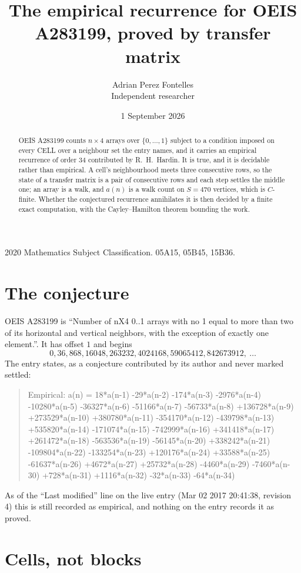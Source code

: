 \documentclass[11pt,a4paper]{article}
\title{The empirical recurrence for OEIS A283199, proved by transfer matrix}
\author{Adrian Perez Fontelles\\ \small Independent researcher}
\date{1 September 2026}
\theoremstyle{plain}
\theoremstyle{definition}
\begin{document}
\maketitle

\begin{abstract}
OEIS A283199 counts $n\times4$ arrays over $\{0,\dots,1\}$ subject to a condition imposed on
every CELL over a neighbour set the entry names, and it carries an empirical recurrence of
order $34$ contributed by R.~H.~Hardin. It is true, and it is decidable rather than
empirical. A cell's neighbourhood meets three consecutive rows, so the state of a transfer
matrix is a pair of consecutive rows and each step settles the middle one; an array is a
walk, and $a(n)$ is a walk count on $S=470$ vertices, which is $C$-finite. Whether the
conjectured recurrence annihilates it is then decided by a finite exact computation, with the
Cayley--Hamilton theorem bounding the work.
\end{abstract}

\noindent\small 2020 Mathematics Subject Classification. 05A15, 05B45, 15B36.\normalsize

\section{The conjecture}

OEIS A283199 is ``Number of nX4 0..1 arrays with no 1 equal to more than two of its horizontal and vertical neighbors, with the exception of exactly one element.''. It has offset $1$ and begins
\[
0, 36, 868, 16048, 263232, 4024168, 59065412, 842673912,\ \dots
\]
The entry states, as a conjecture contributed by its author and never marked settled:
\begin{quote}
Empirical: a(n) = 18*a(n-1) -29*a(n-2) -174*a(n-3) -2976*a(n-4) -10280*a(n-5) -36327*a(n-6) -51166*a(n-7) -56733*a(n-8) +136728*a(n-9) +273529*a(n-10) +380780*a(n-11) -354170*a(n-12) -439798*a(n-13) +535820*a(n-14) -171074*a(n-15) -742999*a(n-16) +341418*a(n-17) +261472*a(n-18) -563536*a(n-19) -56145*a(n-20) +338242*a(n-21) -109804*a(n-22) -133254*a(n-23) +120176*a(n-24) +33588*a(n-25) -61637*a(n-26) +4672*a(n-27) +25732*a(n-28) -4460*a(n-29) -7460*a(n-30) +728*a(n-31) +1116*a(n-32) -32*a(n-33) -64*a(n-34)
\end{quote}
As of the ``Last modified'' line on the live entry (Mar 02 2017 20:41:38, revision 4) this is still
recorded as empirical, and nothing on the entry records it as proved.

\section{Cells, not blocks}
\end{document}
